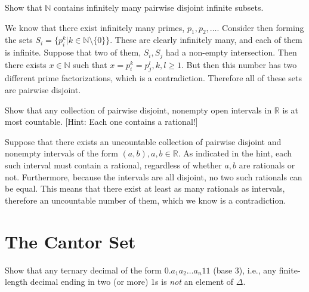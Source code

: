 \begin{exercise}{13}
    Show that $\mathbb{N}$ contains infinitely many pairwise disjoint infinite subsets.
\end{exercise}

\begin{solution}

    We know that there exist infinitely many primes, $p_1, p_2, \ldots$. 
    Consider then forming the sets $S_i = \{p_i^k \lvert k \in \mathbb{N} \setminus \{0\}\}$.
    These are clearly infinitely many, and each of them is infinite.
    Suppose that two of them, $S_i, S_j$ had a non-empty intersection.
    Then there exists $x \in \mathbb{N}$ such that $x = p_i^k = p_j^l, k, l \geq 1$.
    But then this number has two different prime factorizations, which is a contradiction.
    Therefore all of these sets are pairwise disjoint.
\end{solution}

\begin{exercise}{15}
    Show that any collection of pairwise disjoint, nonempty open intervals in $\mathbb{R}$ is at most countable. [Hint: Each one contains a rational!]
\end{exercise}

\begin{solution}

    Suppose that there exists an uncountable collection of pairwise disjoint and nonempty intervals of the form $(a, b), a, b \in \mathbb{R}$.
    As indicated in the hint, each such interval must contain a rational, regardless of whether $a, b$ are rationals or not.
    Furthermore, because the intervals are all disjoint, no two such rationals can be equal.
    This means that there exist at least as many rationals as intervals, therefore an uncountable number of them, which we know is a contradiction.
\end{solution}


\section{The Cantor Set}
    
\begin{exercise}{21}
    Show that any ternary decimal of the form $0.a_1 a_2 \ldots a_n 11$ (base 3), i.e., any finite-length decimal ending in two (or more) 1s is \textit{not} an element of $\Delta$.
\end{exercise}

